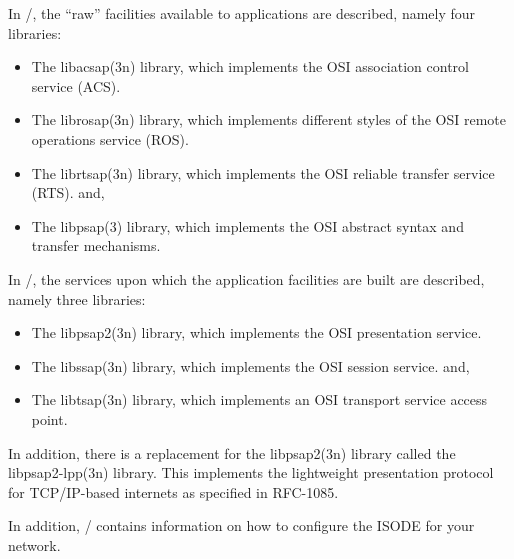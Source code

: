 In \volone/,
the ``raw'' facilities available to applications are described,
namely four libraries:
\begin{itemize}
\item	The \man libacsap(3n) library,
	which implements the OSI association control service (ACS).

\item	The \man librosap(3n) library,
	which implements different styles of the OSI remote operations service
	(ROS).

\item	The \man librtsap(3n) library,
	which implements the OSI reliable transfer service (RTS).
	and,

\item	The \man libpsap(3) library,
	which implements the OSI abstract syntax and transfer mechanisms.
\end{itemize}

In \voltwo/,
the services upon which the application facilities are built are described,
namely three libraries:
\begin{itemize}
\item	The \man libpsap2(3n) library,
	which implements the OSI presentation service.

\item	The \man libssap(3n) library,
	which implements the OSI session service.
	and,

\item	The \man libtsap(3n) library,
	which implements an OSI transport service access point.
\end{itemize}

In addition,
there is a replacement for the \man libpsap2(3n) library called the
\man libpsap2-lpp(3n) library.
This implements the lightweight presentation protocol for TCP/IP-based
internets as specified in RFC-1085.

In addition,
\voltwo/ contains information on how to configure the ISODE for your network.

